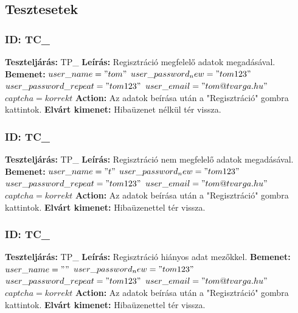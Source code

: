 \documentclass[12pt]{report}
\theoremstyle{definition}
\begin{document}
	\subsection{Tesztesetek}
	\setcounter{TPTCStart}{\value{TC}}
	
	\subsubsection{ID: TC\_}\addtocounter{TC}{1}
	\textbf{Teszteljárás:} TP\_
	\newline 
	\textbf{Leírás:} Regisztráció megfelelő adatok megadásával.
	\newline 
	\textbf{Bemenet:} $user\_name = "tom"$ $user\_password_new = "tom123"$ \linebreak$user\_password\_repeat = "tom123"$ $user\_email = "tom@tvarga.hu"$ $captcha = korrekt$
	\newline 
	\textbf{Action:} Az adatok beírása után a "Regisztráció" gombra kattintok.
	\newline 
	\textbf{Elvárt kimenet:} Hibaüzenet nélkül tér vissza.
	
	\subsubsection{ID: TC\_}\addtocounter{TC}{1}
	\textbf{Teszteljárás:} TP\_
	\newline 
	\textbf{Leírás:} Regisztráció nem megfelelő adatok megadásával.
	\newline 
	\textbf{Bemenet:} $user\_name = "t"$ $user\_password_new = "tom123"$ \linebreak$user\_password\_repeat = "tom123"$ $user\_email = "tom@tvarga.hu"$ $captcha = korrekt$
	\newline 
	\textbf{Action:} Az adatok beírása után a "Regisztráció" gombra kattintok.
	\newline 
	\textbf{Elvárt kimenet:} Hibaüzenettel tér vissza.
	
	\subsubsection{ID: TC\_}\addtocounter{TC}{1}
	\textbf{Teszteljárás:} TP\_
	\newline 
	\textbf{Leírás:} Regisztráció hiányos adat mezőkkel.
	\newline 
	\textbf{Bemenet:} $user\_name = ""$ $user\_password_new = "tom123"$ $user\_password\_repeat = "tom123"$ $user\_email = "tom@tvarga.hu"$ $captcha = korrekt$
	\newline 
	\textbf{Action:} Az adatok beírása után a "Regisztráció" gombra kattintok.
	\newline 
	\textbf{Elvárt kimenet:} Hibaüzenettel tér vissza.
	
\end{document}
